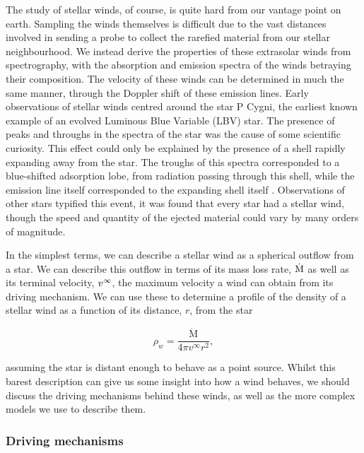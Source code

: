 The study of stellar winds, of course, is quite hard from our vantage point on earth.
Sampling the winds themselves is difficult due to the vast distances involved in sending a probe to collect the rarefied material from our stellar neighbourhood.
We instead derive the properties of these extrasolar winds from spectrography, with the absorption and emission spectra of the winds betraying their composition.
The velocity of these winds can be determined in much the same manner, through the Doppler shift of these emission lines.
Early observations of stellar winds centred around the star P Cygni, the earliest known example of an evolved Luminous Blue Variable (LBV) star.
The presence of peaks and throughs in the spectra of the star was the cause of some scientific curiosity.
This effect could only be explained by the presence of a shell rapidly expanding away from the star.
The troughs of this spectra corresponded to a blue-shifted adsorption lobe, from radiation passing through this shell, while the emission line itself corresponded to the expanding shell itself \parencite{bealsNatureWolfRayetEmission1929,lamersIntroductionStellarWinds1999}.
Observations of other stars typified this event, it was found that every star had a stellar wind, though the speed and quantity of the ejected material could vary by many orders of magnitude.

In the simplest terms, we can describe a stellar wind as a spherical outflow from a star.
We can describe this outflow in terms of its mass loss rate, $\dot{\text{M}}$ as well as its terminal velocity, $v^\infty$, the maximum velocity a wind can obtain from its driving mechanism.
We can use these to determine a profile of the density of a stellar wind as a function of its distance, $r$, from the star

\begin{equation}
  \rho_w = \frac{\dot{\text{M}}}{4 \pi v^\infty r^2}, \label{eq:smoothwind}
\end{equation}

\noindent
assuming the star is distant enough to behave as a point source.
Whilst this barest description can give us some insight into how a wind behaves, we should discuss the driving mechanisms behind these winds, as well as the more complex models we use to describe them.

\subsubsection{Driving mechanisms}

